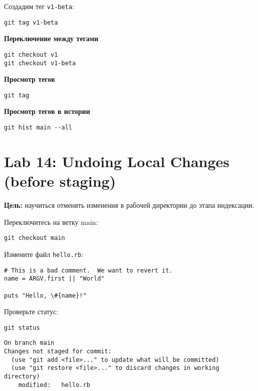 \documentclass[a4paper,12pt]{report}
\begin{document}
Создадим тег \texttt{v1-beta}:
\begin{verbatim}
git tag v1-beta
\end{verbatim}

\textbf{Переключение между тегами}
\begin{verbatim}
git checkout v1
git checkout v1-beta
\end{verbatim}


\textbf{Просмотр тегов}
\begin{verbatim}
git tag
\end{verbatim}

\textbf{Просмотр тегов в истории}
\begin{verbatim}
git hist main --all
\end{verbatim}


\section{Lab 14: Undoing Local Changes (before staging)}
\textbf{Цель:} научиться отменять изменения в рабочей директории до этапа индексации.

Переключитесь на ветку main:
\begin{verbatim}
git checkout main
\end{verbatim}

Измените файл \texttt{hello.rb}:
\begin{verbatim}
# This is a bad comment.  We want to revert it.
name = ARGV.first || "World"

puts "Hello, \#{name}!"
\end{verbatim}

Проверьте статус:
\begin{verbatim}
git status
\end{verbatim}

\begin{verbatim}
On branch main
Changes not staged for commit:
  (use "git add <file>..." to update what will be committed)
  (use "git restore <file>..." to discard changes in working directory)
	modified:   hello.rb
\end{verbatim}
\end{document}
